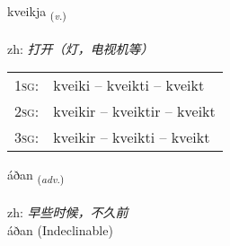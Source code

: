 \documentclass[frontgrid, backgrid]{flacards}\usepackage[]{graphicx}\usepackage[]{color}
\begin{document}
\renewcommand{\blhead}{\vskip5pt {\small\bfseries\footnotesize Sagnorð | 动词 }}
\renewcommand{\bcfoot}{\vskip5pt \hspace{2pt}{\small\bfseries\footnotesize 2K}}


{kveikja \small{\textsubscript{(\textit{v.})}} \\[1ex] %
\textphonetic{[kʰveiːca]} \\
zh: \emph{打开（灯，电视机等）} \\  [2ex]
\renewcommand*{\arraystretch}{0.8}
\begin{tabular}{p{1cm}l}
\textsc{1sg}: & kveiki -- kveikti -- kveikt \\ 
\textsc{2sg}: & kveikir -- kveiktir -- kveikt \\ 
\textsc{3sg}: & kveikir -- kveikti -- kveikt \\ 
\end{tabular}
}


\renewcommand{\flhead}{\vskip5pt \fboxsep=0pt {\small\bfseries\footnotesize Atviksorð | 副词}}
\renewcommand{\fcfoot}{\vskip5pt \fboxsep=0pt \hspace{2pt}{\small\bfseries\footnotesize 2K}}

\renewcommand{\blhead}{\vskip5pt {\small\bfseries\footnotesize Atviksorð | 副词 }}
\renewcommand{\bcfoot}{\vskip5pt \hspace{2pt}{\small\bfseries\footnotesize 2K}}


{áðan \small{\textsubscript{(\textit{adv.})}} \\[1ex]
\textphonetic{[auːðan]} \\
zh: \emph{早些时候，不久前} \\  [2ex]
áðan (Indeclinable)}

\renewcommand{\flhead}{\vskip5pt \fboxsep=0pt {\small\bfseries\footnotesize Nafnorð | 名词}}
\renewcommand{\fcfoot}{\vskip5pt \fboxsep=0pt \hspace{2pt}{\small\bfseries\footnotesize 2K}}

\renewcommand{\blhead}{\vskip5pt {\small\bfseries\footnotesize Nafnorð | 名词 }}
\renewcommand{\bcfoot}{\vskip5pt \hspace{2pt}{\small\bfseries\footnotesize 2K}}
\end{document}
